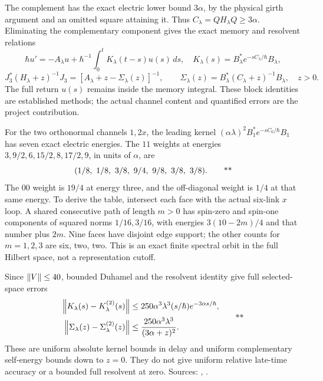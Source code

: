 The complement has the exact electric lower bound \(3\alpha\), by the
physical girth argument and an omitted square attaining it. Thus
\(C_\lambda=QH_\lambda Q\ge3\alpha\). Eliminating the complementary
component gives the exact memory and resolvent relations
\[
 \hbar u'=-A_\lambda u+\hbar^{-1}
       \int_0^tK_\lambda(t-s)u(s)\,ds,\quad
 K_\lambda(s)=B_\lambda^*e^{-sC_\lambda/\hbar}B_\lambda,
\]
\[
 J_3^*(H_\lambda+z)^{-1}J_3
 =[A_\lambda+z-\Sigma_\lambda(z)]^{-1},\qquad
 \Sigma_\lambda(z)=B_\lambda^*(C_\lambda+z)^{-1}B_\lambda,\quad z>0.
\]
The full return \(u(s)\) remains inside the memory integral.
These block identities are established methods; the actual channel
content and quantified errors are the project contribution.

For the two orthonormal channels \(1,2x\), the leading kernel
\((\alpha\lambda)^2B_1^*e^{-sC_0/\hbar}B_1\) has seven exact electric
energies. The \(11\) weights at energies
\(3,9/2,6,15/2,8,17/2,9\), in units of \(\alpha\), are
\[
 (1/8,\ 1/8,\ 3/8,\ 9/4,\ 9/8,\ 3/8,\ 3/8).
 \qquad\text{\workstar}
\]
The \(00\) weight is \(19/4\) at energy three, and the off-diagonal
weight is \(1/4\) at that same energy. To derive the table, intersect
each face with the actual six-link \(x\) loop. A shared consecutive
path of length \(m>0\) has spin-zero and spin-one components of squared
norms \(1/16,3/16\), with energies
\(3(10-2m)/4\) and that number plus \(2m\). Nine faces have disjoint
edge support; the other counts for \(m=1,2,3\) are six, two, two.
This is an exact finite spectral orbit in the full Hilbert space,
not a representation cutoff.

Since \(\left\lVert V\right\rVert\le40\), bounded Duhamel and the resolvent identity give
full selected-space errors
\begin{equation}
 \begin{split}
 \left\lVert K_\lambda(s)-K_\lambda^{(2)}(s)\right\rVert
 &\le250\alpha^3\lambda^3(s/\hbar)e^{-3\alpha s/\hbar},\\
 \left\lVert \Sigma_\lambda(z)-\Sigma_\lambda^{(2)}(z)\right\rVert
 &\le\frac{250\alpha^3\lambda^3}{(3\alpha+z)^2}.
 \end{split}
 \qquad\text{**}
 \label{eq:middle-memory-errors}
\end{equation}
These are uniform absolute kernel bounds in delay and uniform
complementary self-energy bounds down to \(z=0\). They do not give uniform
relative late-time accuracy or a bounded full resolvent at zero.
Sources: ,
.


